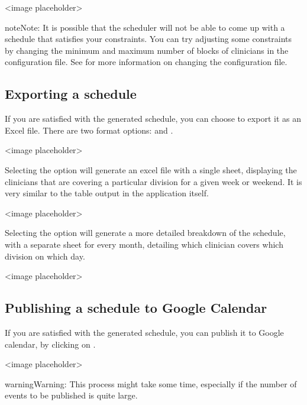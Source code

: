\documentclass[letterpaper,10pt,english]{sphinxmanual}
\begin{document}
\textless{}image placeholder\textgreater{}

\begin{sphinxadmonition}{note}{Note:}
It is possible that the scheduler will not be able to come up with a
schedule that satisfies your constraints. You can try adjusting
some constraints by changing the minimum and maximum number of blocks of
clinicians in the configuration file. See {\hyperref[\detokenize{index:clinician-configuration}]{}}
for more information on changing the configuration file.
\end{sphinxadmonition}


\subsection{Exporting a schedule}
\label{\detokenize{index:exporting-a-schedule}}
If you are satisfied with the generated schedule, you can choose to export
it as an Excel file. There are two format options:  and
.

\textless{}image placeholder\textgreater{}

Selecting the  option will generate an excel file with a single
sheet, displaying the clinicians that are covering a particular division
for a given week or weekend. It is very similar to the table output in
the application itself.

\textless{}image placeholder\textgreater{}

Selecting the  option will generate a more detailed breakdown
of the schedule, with a separate sheet for every month, detailing which
clinician covers which division on which day.

\textless{}image placeholder\textgreater{}


\subsection{Publishing a schedule to Google Calendar}
\label{\detokenize{index:publishing-a-schedule-to-google-calendar}}\label{\detokenize{index:id6}}
If you are satisfied with the generated schedule, you can publish it
to Google calendar, by clicking on .

\textless{}image placeholder\textgreater{}

\begin{sphinxadmonition}{warning}{Warning:}
This process might take some time, especially if the number of events
to be published is quite large.
\end{sphinxadmonition}
\end{document}
